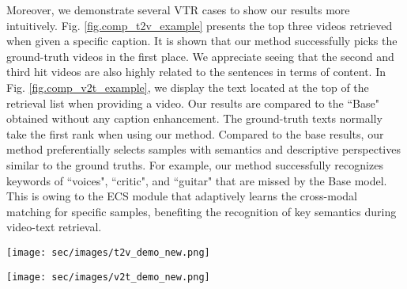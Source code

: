 Moreover, we demonstrate several VTR cases to show our results more intuitively.
Fig. \ref{fig.comp_t2v_example} presents the top three videos retrieved when given a specific caption. It is shown that 
our method successfully picks the ground-truth videos in the first place. We appreciate seeing that the second and third hit videos are also highly related to the sentences in terms of content.
In Fig. \ref{fig.comp_v2t_example}, we display the text located at the top of the retrieval list when providing a video. Our results are compared to the ``Base" obtained without any caption enhancement.
The ground-truth texts normally take the first rank when using our method. Compared to the base results, our method preferentially selects samples with semantics and descriptive perspectives similar to the ground truths.
For example, our method successfully recognizes keywords of ``voices", ``critic", and ``guitar" that are missed by the Base model.
This is owing to the ECS module that adaptively learns the cross-modal matching for specific samples, benefiting the recognition of key semantics during video-text retrieval.


\begin{figure*}[t]
	\centering
	\texttt{[image: sec/images/t2v\_demo\_new.png]}
        \vspace{-0.5em}
	\caption{Examples of text-to-video retrieval results on MSR-VTT dataset.  \textit{(The ground truths are marked in a red box.)}}
	\label{fig.comp_t2v_example}
\end{figure*}



\begin{figure*}[t]
	\centering
	\texttt{[image: sec/images/v2t\_demo\_new.png]}
        \vspace{-0.5em}
	\caption{Examples of video-to-text retrieval results on MSR-VTT dataset.  \textit{(The ground truths are marked in a red box.)}}
	\label{fig.comp_v2t_example}
\end{figure*}





